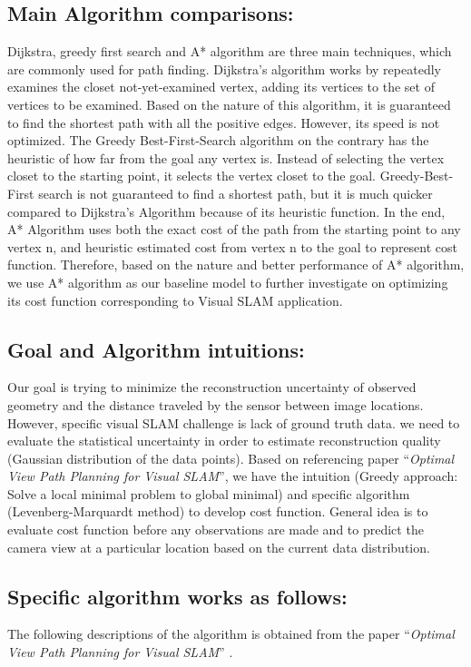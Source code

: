 \documentclass[letterpaper, 10 pt, conference]{IEEEtran}
\begin{document}
\subsection{Main Algorithm comparisons:} \label{sect:\thesubsection}
Dijkstra, greedy first search and A* algorithm are three main techniques, which
are commonly used for path finding. Dijkstra's algorithm works by repeatedly
examines the closet not-yet-examined vertex, adding its vertices to the set of
vertices to be examined. Based on the nature of this algorithm, it is guaranteed
to find the shortest path with all the positive edges. However, its speed is not
optimized. The Greedy Best-First-Search algorithm on the contrary has the
heuristic of how far from the goal any vertex is. Instead of selecting the
vertex closet to the starting point, it selects the vertex closet to the goal.
Greedy-Best-First search is not guaranteed to find a shortest path, but it is
much quicker compared to Dijkstra's Algorithm because of its heuristic function.
In the end, A* Algorithm uses both the exact cost of the path from the starting
point to any vertex n, and heuristic estimated cost from vertex n to the goal to
represent cost function. Therefore, based on the nature and better performance
of A* algorithm, we use A* algorithm as our baseline model to further
investigate on optimizing its cost function corresponding to Visual SLAM
application. 

\subsection{Goal and Algorithm intuitions:} \label{sect:\thesubsection}
Our goal is trying to minimize the reconstruction uncertainty of observed
geometry and the distance traveled by the sensor between image locations.
However, specific visual SLAM challenge is lack of ground truth data. we need to
evaluate the statistical uncertainty in order to estimate reconstruction quality
\cite{c18} (Gaussian distribution of the data points). Based on referencing
paper ``\textit{Optimal View Path Planning for Visual SLAM}'', we have the
intuition (Greedy approach: Solve a local minimal problem to global
minimal) \cite{c18} and specific algorithm (Levenberg-Marquardt method) to
develop cost function. General idea is to evaluate cost function before any
observations are made and to predict the camera view at a particular location
based on the current data distribution.

\subsection{Specific algorithm works as follows:} \label{sect:\thesubsection}
The following descriptions of the algorithm is obtained from the paper
``\textit{Optimal View Path Planning for Visual SLAM}'' \cite{c18}.
\end{document}

